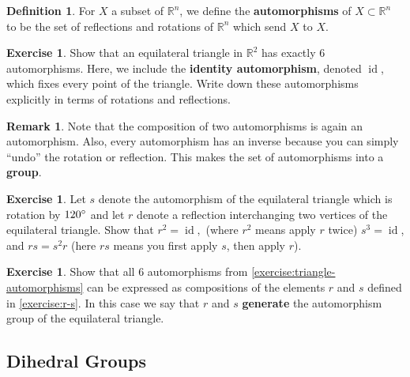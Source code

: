 \documentclass[reqno, 12pt, letter]{article}
\theoremstyle{plain}
\theoremstyle{definition}
\newtheorem{definition}[theorem]{Definition}
\newtheorem{remark}[theorem]{Remark}
\newtheorem{exercise}[theorem]{Exercise}
\theoremstyle{remark}
\numberwithin{equation}{section}
\newcommand\br{{\mathbb R}}
\DeclareMathOperator\id{id}
\begin{document}
\begin{definition}
	\label{definition:automorphisms}
	For $X$ a subset of $\br^n$, we define the {\bf automorphisms} of $X \subset \br^n$ to be the set of
	reflections and rotations of $\br^n$ which send $X$ to $X$.
\end{definition}

\begin{exercise}
	\label{exercise:triangle-automorphisms}
	Show that an equilateral triangle in $\br^2$ has exactly $6$ automorphisms.
	Here, we include the {\bf identity automorphism}, denoted $\id$, which fixes every point of the triangle.
	Write down these automorphisms explicitly in terms of rotations and reflections.
\end{exercise}
\begin{remark}
	\label{remark:aut-is-group}
	Note that the composition of two automorphisms is again an automorphism.
	Also, every automorphism has an inverse because you can simply ``undo'' the rotation or reflection.
	This makes the set of automorphisms into a {\bf group}.
\end{remark}
\begin{exercise}
	\label{exercise:r-s}
	Let $s$ denote the automorphism of the equilateral triangle which is rotation by $120\degree$
	and let $r$ denote a reflection interchanging two vertices of the equilateral triangle.
	Show that $r^2= \id,$ (where $r^2$ means apply $r$ twice) $s^3 = \id$, and $rs = s^2r$ (here $rs$ means you first apply $s$, then apply $r$).
\end{exercise}
\begin{exercise}
	\label{exercise:}
	Show that all $6$ automorphisms from \autoref{exercise:triangle-automorphisms} can be expressed as compositions
	of the elements $r$ and $s$ defined in \autoref{exercise:r-s}. In this case we say that $r$ and $s$ {\bf generate}
	the automorphism group of the equilateral triangle.
\end{exercise}

\subsection{Dihedral Groups}
\end{document}
